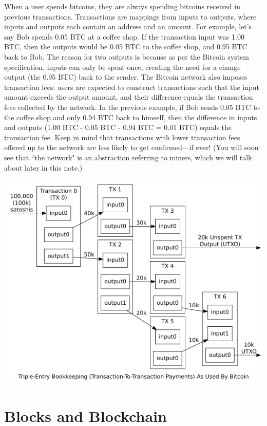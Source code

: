 \documentclass[11pt]{article}
\begin{document}
    When a user spends bitcoins, they are always spending bitcoins received in previous transactions. Transactions are mappings from inputs to outputs, where inputs and outputs each contain an address and an amount. For example, let's say Bob spends 0.05 BTC at a coffee shop. If the transaction input was 1.00 BTC, then the outputs would be 0.05 BTC to the coffee shop, and 0.95 BTC back to Bob. The reason for two outputs is because as per the Bitcoin system specification, inputs can only be spent once, creating the need for a change output (the 0.95 BTC) back to the sender. The Bitcoin network also imposes transaction fees: users are expected to construct transactions such that the input amount exceeds the output amount, and their difference equals the transaction fees collected by the network. In the previous example, if Bob sends 0.05 BTC to the coffee shop and only 0.94 BTC back to himself, then the difference in inputs and outputs (1.00 BTC - 0.05 BTC - 0.94 BTC = 0.01 BTC) equals the transaction fee. Keep in mind that transactions with lower transaction fees offered up to the network are less likely to get confirmed---if ever! (You will soon see that ``the network" is an abstraction referring to miners, which we will talk about later in this note.)
    
    \includegraphics[scale=0.9]{transactions}
    
    \section*{Blocks and Blockchain}
    
\end{document}
